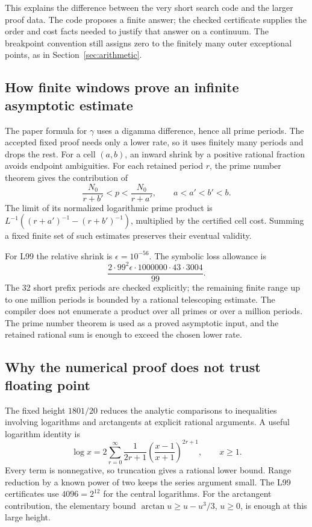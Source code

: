 This explains the difference between the very short search code
and the larger proof data. The code proposes a finite answer; the
checked certificate supplies the order and cost facts needed to
justify that answer on a continuum. The breakpoint convention
still assigns zero to the finitely many outer exceptional points,
as in Section~\ref{sec:arithmetic}.

\subsection{How finite windows prove an infinite asymptotic estimate}

The paper formula for \(\gamma\) uses a digamma difference, hence
all prime periods. The accepted fixed proof needs only a lower
rate, so it uses finitely many periods and drops the rest. For a
cell \((a,b)\), an inward shrink by a positive rational fraction
avoids endpoint ambiguities. For each retained period \(r\), the
prime number theorem gives the contribution of
\[
\frac{N_0}{r+b'}<p<\frac{N_0}{r+a'},
\qquad a<a'<b'<b.
\]
The limit of its normalized logarithmic prime product is
\(L^{-1}((r+a')^{-1}-(r+b')^{-1})\), multiplied by the
certified cell cost. Summing a fixed finite set of such estimates
preserves their eventual validity.

For L99 the relative shrink is \(\epsilon=10^{-56}\). The
symbolic loss allowance is
\[
\frac{2\cdot99^2\epsilon\cdot1000000\cdot43\cdot3004}{99}.
\]
The 32 short prefix periods are checked explicitly; the remaining
finite range up to one million periods is bounded by a rational
telescoping estimate. The compiler does not enumerate a product
over all primes or over a million periods. The prime number
theorem is used as a proved asymptotic input, and the retained
rational sum is enough to exceed the chosen lower rate.

\subsection{Why the numerical proof does not trust floating point}

The fixed height \(1801/20\) reduces the analytic comparisons to
inequalities involving logarithms and arctangents at explicit
rational arguments. A useful logarithm identity is
\[
\log x=2\sum_{r=0}^{\infty}
\frac{1}{2r+1}\left(\frac{x-1}{x+1}\right)^{2r+1},
\qquad x\ge1.
\]
Every term is nonnegative, so truncation gives a rational lower
bound. Range reduction by a known power of two keeps the series
argument small. The L99 certificates use \(4096=2^{12}\) for
the central logarithms. For the arctangent contribution, the
elementary bound \(\arctan u\ge u-u^3/3\), \(u\ge0\), is
enough at this large height.

